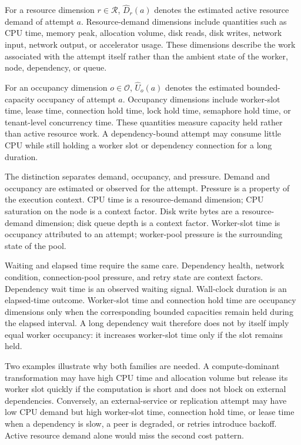 For a resource dimension $r \in \mathcal{R}$, $\widehat{D}_r(a)$ denotes the
estimated active resource demand of attempt $a$. Resource-demand dimensions
include quantities such as CPU time, memory peak, allocation volume, disk reads,
disk writes, network input, network output, or accelerator usage. These
dimensions describe the work associated with the attempt itself rather than the
ambient state of the worker, node, dependency, or queue.

For an occupancy dimension $o \in \mathcal{O}$, $\widehat{U}_o(a)$ denotes the
estimated bounded-capacity occupancy of attempt $a$. Occupancy dimensions
include worker-slot time, lease time, connection hold time, lock hold time,
semaphore hold time, or tenant-level concurrency time. These quantities measure
capacity held rather than active resource work. A dependency-bound attempt may
consume little CPU while still holding a worker slot or dependency connection for
a long duration.

The distinction separates demand, occupancy, and pressure. Demand and occupancy
are estimated or observed for the attempt. Pressure is a property of the
execution context. CPU time is a resource-demand dimension; CPU saturation on
the node is a context factor. Disk write bytes are a resource-demand dimension;
disk queue depth is a context factor. Worker-slot time is occupancy attributed
to an attempt; worker-pool pressure is the surrounding state of the pool.

Waiting and elapsed time require the same care. Dependency health, network
condition, connection-pool pressure, and retry state are context factors.
Dependency wait time is an observed waiting signal. Wall-clock duration is an
elapsed-time outcome. Worker-slot time and connection hold time are occupancy
dimensions only when the corresponding bounded capacities remain held during the
elapsed interval. A long dependency wait therefore does not by itself imply equal
worker occupancy: it increases worker-slot time only if the slot remains held.

Two examples illustrate why both families are needed. A compute-dominant
transformation may have high CPU time and allocation volume but release its
worker slot quickly if the computation is short and does not block on external
dependencies. Conversely, an external-service or replication attempt may have
low CPU demand but high worker-slot time, connection hold time, or lease time
when a dependency is slow, a peer is degraded, or retries introduce backoff.
Active resource demand alone would miss the second cost pattern.

